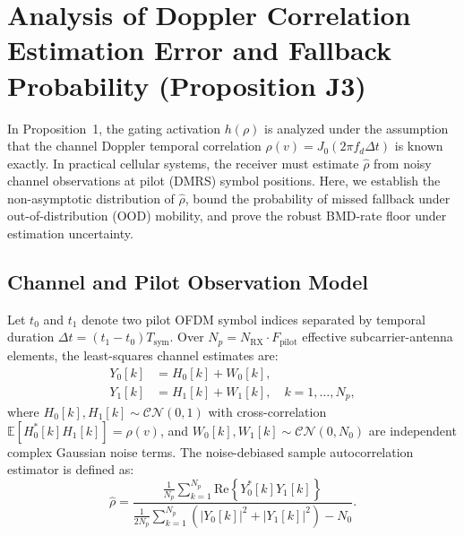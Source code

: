 
\section{Analysis of Doppler Correlation Estimation Error and Fallback Probability (Proposition J3)}
\label{app:proposition_j3}

In Proposition~1, the gating activation $h(\rho)$ is analyzed under the assumption that the channel Doppler temporal correlation $\rho(v) = J_0(2\pi f_d \Delta t)$ is known exactly. In practical cellular systems, the receiver must estimate $\hat{\rho}$ from noisy channel observations at pilot (DMRS) symbol positions. Here, we establish the non-asymptotic distribution of $\hat{\rho}$, bound the probability of missed fallback under out-of-distribution (OOD) mobility, and prove the robust BMD-rate floor under estimation uncertainty.

\subsection{Channel and Pilot Observation Model}
Let $t_0$ and $t_1$ denote two pilot OFDM symbol indices separated by temporal duration $\Delta t = (t_1 - t_0) T_{\mathrm{sym}}$. Over $N_p = N_{\mathrm{RX}} \cdot F_{\mathrm{pilot}}$ effective subcarrier-antenna elements, the least-squares channel estimates are:
\begin{align}
    Y_0[k] &= H_0[k] + W_0[k], \\
    Y_1[k] &= H_1[k] + W_1[k], \quad k = 1, \dots, N_p,
\end{align}
where $H_0[k], H_1[k] \sim \mathcal{CN}(0, 1)$ with cross-correlation $\mathbb{E}[H_0^*[k] H_1[k]] = \rho(v)$, and $W_0[k], W_1[k] \sim \mathcal{CN}(0, N_0)$ are independent complex Gaussian noise terms. The noise-debiased sample autocorrelation estimator is defined as:
\begin{equation}
    \hat{\rho} = \frac{\frac{1}{N_p} \sum_{k=1}^{N_p} \mathrm{Re}\left\{ Y_0^*[k] Y_1[k] \right\}}{\frac{1}{2 N_p} \sum_{k=1}^{N_p} \left( |Y_0[k]|^2 + |Y_1[k]|^2 \right) - N_0}.
\end{equation}

